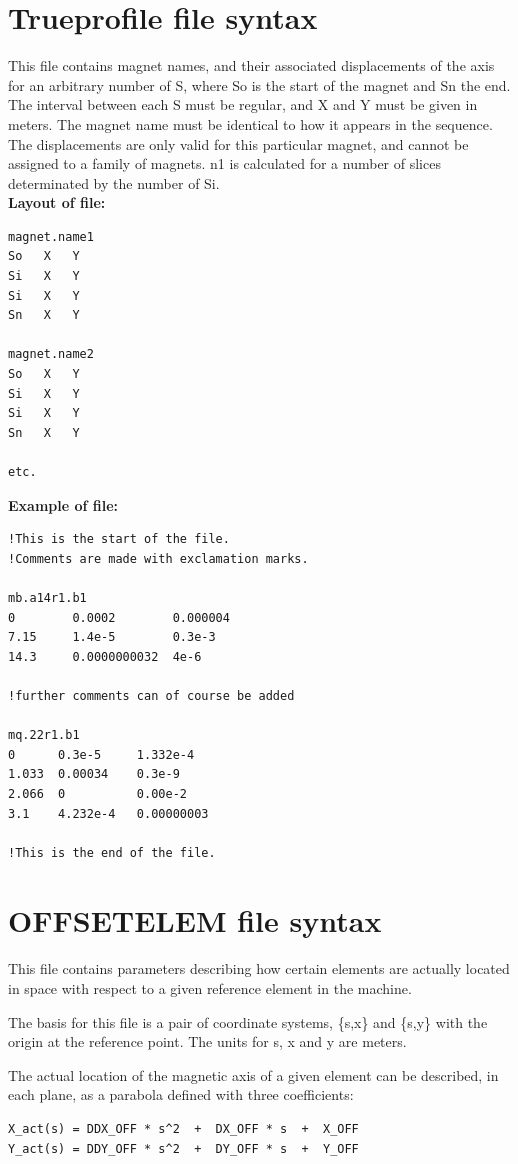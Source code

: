 \section{Trueprofile file syntax}
This file contains magnet names, and their associated displacements of
the axis for  an arbitrary number of S, where So is the start of the
magnet and Sn the end. The interval between each S must be regular, and
X and Y  must be given in meters. The magnet name must be identical to
how it appears in the  sequence. The displacements are only valid for
this particular magnet, and cannot be  assigned to a family of
magnets. n1 is calculated for a number of slices determinated by the
number of Si. 
\\
{\bf Layout of file:}
\begin{verbatim}
magnet.name1
So   X   Y
Si   X   Y
Si   X   Y
Sn   X   Y

magnet.name2
So   X   Y
Si   X   Y
Si   X   Y
Sn   X   Y

etc.
\end{verbatim}

{\bf Example of file:}
\begin{verbatim}
!This is the start of the file.
!Comments are made with exclamation marks.

mb.a14r1.b1
0        0.0002        0.000004
7.15     1.4e-5        0.3e-3
14.3     0.0000000032  4e-6

!further comments can of course be added

mq.22r1.b1
0      0.3e-5     1.332e-4
1.033  0.00034    0.3e-9
2.066  0          0.00e-2
3.1    4.232e-4   0.00000003

!This is the end of the file.
\end{verbatim}

\section{OFFSETELEM file syntax}
This file contains parameters describing how certain elements are
actually located in space with respect to a given reference element in
the machine.  

The basis for this file is a pair of coordinate systems, \{s,x\} and \{s,y\} 
with the origin at the reference point. The units for s, x and y are
meters.

The actual location of the magnetic axis of a given element can be
described, in each plane, as a parabola defined with three coefficients: 
\begin{verbatim}
X_act(s) = DDX_OFF * s^2  +  DX_OFF * s  +  X_OFF
Y_act(s) = DDY_OFF * s^2  +  DY_OFF * s  +  Y_OFF
\end{verbatim} 

